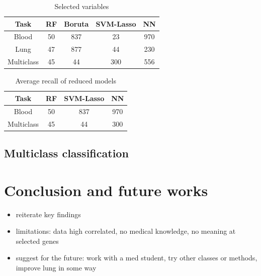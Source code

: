 \documentclass[a4paper,11pt, oneside]{article}  %
\begin{document}
\begin{table}[ht]
\caption{Selected variables}
\centering
\begin{tabular}{c c c c c}
\hline\hline
Task & RF & Boruta & SVM-Lasso & NN \\ [0.5ex] %
\hline
Blood & 50 &837 & 23 & 970 \\
Lung &47 & 877 & 44 & 230 \\
Multiclass & 45 &  44 & 300 & 556 \\ [1ex]
\hline
\end{tabular}
\label{table:selected variables}
\end{table}

\begin{table}[ht]
\caption{Average recall of reduced models}
\centering
\begin{tabular}{c c c c}
\hline\hline
Task & RF & SVM-Lasso & NN \\ [0.5ex] %
\hline
Blood & 50 &837 & 970 \\
Multiclass & 45 &  44 & 300 \\ [1ex]
\hline
\end{tabular}
\label{table:reduced_models}
\end{table}





\subsection{Multiclass classification}


\section{Conclusion and future works}
\begin{itemize}
\item reiterate key findings
\item limitations: data high correlated,  no medical knowledge,  no meaning at selected genes
\item suggest for the future: work with a med student,  try other classes or methods,  improve lung in some way
\end{itemize}
\end{document}
